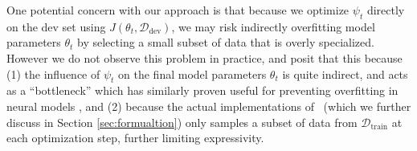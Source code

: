 One potential concern with our approach is that because we optimize $\psi_t$ directly on the dev set using $J(\theta_t, \mathcal{D}_\text{dev})$, we may risk indirectly overfitting model parameters $\theta_t$ by selecting a small subset of data that is overly specialized.
However we do not observe this problem in practice, and posit that this because (1) the influence of $\psi_t$ on the final model parameters $\theta_t$ is quite indirect, and acts as a ``bottleneck'' which has similarly proven useful for preventing overfitting in neural models \cite{grezl2007probabilistic}, and (2) because the actual implementations of \dds~(which we further discuss in Section \ref{sec:formualtion}) only samples a subset of data from $\mathcal{D}_\text{train}$ at each optimization step, further limiting expressivity.

